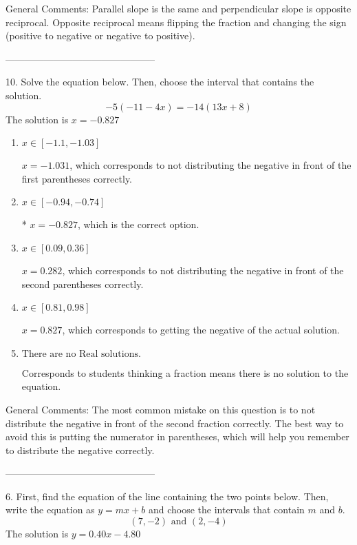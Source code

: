 \documentclass{article}[14pt]
\begin{document}
General Comments: Parallel slope is the same and perpendicular slope is opposite reciprocal. Opposite reciprocal means flipping the fraction and changing the sign (positive to negative or negative to positive).

-----------------------------------------------

10. Solve the equation below. Then, choose the interval that contains the solution.
$$ -5(-11-4 x) = -14(13 x+8) $$ 
The solution is $ x = -0.827 $ 

\begin{enumerate}[label=\Alph*.] 
\item $ x \in [-1.1, -1.03] $ 

  $x = -1.031$, which corresponds to not distributing the negative in front of the first parentheses correctly. 
\item $ x \in [-0.94, -0.74] $ 

 * $x = -0.827$, which is the correct option. 
\item $ x \in [0.09, 0.36] $ 

  $x = 0.282$, which corresponds to not distributing the negative in front of the second parentheses correctly. 
\item $ x \in [0.81, 0.98] $ 

  $x = 0.827$, which corresponds to getting the negative of the actual solution. 
\item $ \text{There are no Real solutions. } $ 

 Corresponds to students thinking a fraction means there is no solution to the equation. 
\end{enumerate} 
 
General Comments: The most common mistake on this question is to not distribute the negative in front of the second fraction correctly. The best way to avoid this is putting the numerator in parentheses, which will help you remember to distribute the negative correctly.

-----------------------------------------------

6. First, find the equation of the line containing the two points below. Then, write the equation as $ y=mx+b $ and choose the intervals that contain $m$ and $b$.
$$ (7, -2) \text{ and } (2, -4) $$ 
The solution is $ y = 0.40x - 4.80 $ 
\end{document}
